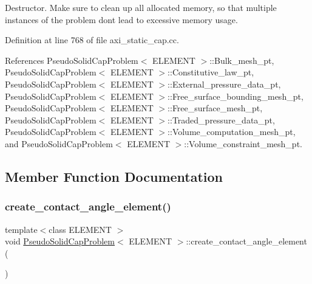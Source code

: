 Destructor. Make sure to clean up all allocated memory, so that multiple instances of the problem don\textquotesingle{}t lead to excessive memory usage. 

Definition at line 768 of file axi\+\_\+static\+\_\+cap.\+cc.



References Pseudo\+Solid\+Cap\+Problem$<$ E\+L\+E\+M\+E\+N\+T $>$\+::\+Bulk\+\_\+mesh\+\_\+pt, Pseudo\+Solid\+Cap\+Problem$<$ E\+L\+E\+M\+E\+N\+T $>$\+::\+Constitutive\+\_\+law\+\_\+pt, Pseudo\+Solid\+Cap\+Problem$<$ E\+L\+E\+M\+E\+N\+T $>$\+::\+External\+\_\+pressure\+\_\+data\+\_\+pt, Pseudo\+Solid\+Cap\+Problem$<$ E\+L\+E\+M\+E\+N\+T $>$\+::\+Free\+\_\+surface\+\_\+bounding\+\_\+mesh\+\_\+pt, Pseudo\+Solid\+Cap\+Problem$<$ E\+L\+E\+M\+E\+N\+T $>$\+::\+Free\+\_\+surface\+\_\+mesh\+\_\+pt, Pseudo\+Solid\+Cap\+Problem$<$ E\+L\+E\+M\+E\+N\+T $>$\+::\+Traded\+\_\+pressure\+\_\+data\+\_\+pt, Pseudo\+Solid\+Cap\+Problem$<$ E\+L\+E\+M\+E\+N\+T $>$\+::\+Volume\+\_\+computation\+\_\+mesh\+\_\+pt, and Pseudo\+Solid\+Cap\+Problem$<$ E\+L\+E\+M\+E\+N\+T $>$\+::\+Volume\+\_\+constraint\+\_\+mesh\+\_\+pt.



\subsection{Member Function Documentation}
\mbox{\label{classPseudoSolidCapProblem_a8f28ebf09bc66142725139291b4e21a0}} 
\subsubsection{\texorpdfstring{create\+\_\+contact\+\_\+angle\+\_\+element()}{create\_contact\_angle\_element()}}
{\footnotesize\ttfamily template$<$class E\+L\+E\+M\+E\+NT $>$ \\
void \hyperlink{classPseudoSolidCapProblem}{Pseudo\+Solid\+Cap\+Problem}$<$ E\+L\+E\+M\+E\+NT $>$\+::create\+\_\+contact\+\_\+angle\+\_\+element (\begin{DoxyParamCaption}{ }\end{DoxyParamCaption})\hspace{0.3cm}{\ttfamily [private]}}




